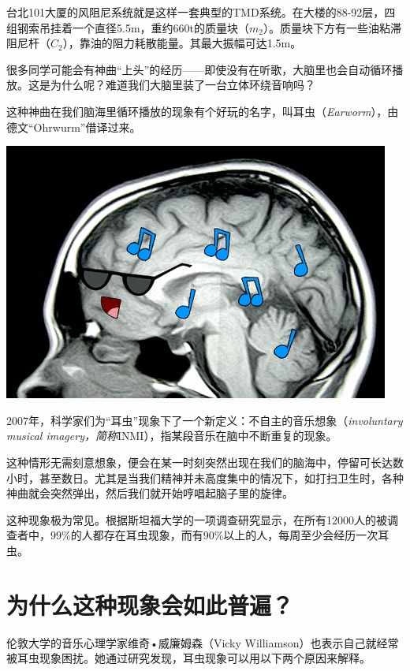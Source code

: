\begin{multicols}{3}
台北101大厦的风阻尼系统就是这样一套典型的TMD系统。在大楼的88-92层，四组钢索吊挂着一个直径5.5m，重约660t的质量块（$m_2$）。质量块下方有一些油粘滞阻尼杆（$C_2$），靠油的阻力耗散能量。其最大振幅可达1.5m。\EOA
\end{multicols}
\newpage
{}

\begin{multicols}{3}

很多同学可能会有神曲“上头”的经历——即使没有在听歌，大脑里也会自动循环播放。这是为什么呢？难道我们大脑里装了一台立体环绕音响吗？


这种神曲在我们脑海里循环播放的现象有个好玩的名字，叫耳虫（\textit{Earworm}），由德文“Ohrwurm”借译过来。


\noindent\includegraphics[width=\linewidth]{IMG/202001/image001.jpg}
 

2007年，科学家们为“耳虫”现象下了一个新定义：不自主的音乐想象（\textit{involuntary musical imagery，简称}INMI），指某段音乐在脑中不断重复的现象。

这种情形无需刻意想象，便会在某一时刻突然出现在我们的脑海中，停留可长达数小时，甚至数日。尤其是当我们精神并未高度集中的情况下，如打扫卫生时，各种神曲就会突然弹出，然后我们就开始哼唱起脑子里的旋律。


这种现象极为常见。根据斯坦福大学的一项调查研究显示，在所有12000人的被调查者中，99\%的人都存在耳虫现象，而有90\%以上的人，每周至少会经历一次耳虫。

\section*{为什么这种现象会如此普遍？}

伦敦大学的音乐心理学家维奇•威廉姆森（Vicky Williamson）也表示自己就经常被耳虫现象困扰。她通过研究发现，耳虫现象可以用以下两个原因来解释。


\end{multicols}
